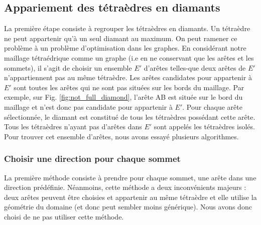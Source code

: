 \subsection{Appariement des tétraèdres en diamants}
\noindent
La première étape consiste à regrouper les tétraèdres en diamants. Un tétraèdre ne peut appartenir qu'à un seul diamant au maximum. On peut ramener ce problème à un problème d'optimisation dans les graphes. En considérant notre maillage tétraédrique comme un graphe (i.e en ne conservant que les arêtes et les sommets), il s'agit de choisir un ensemble $E'$ d'arêtes telles-que deux arêtes de $E'$ n'appartiennent pas au même tétraèdre. Les arêtes candidates pour appartenir à $E'$ sont toutes les arêtes qui ne sont pas situées sur les bords du maillage. Par exemple, sur Fig. \ref{fig:not_full_diamond}, l'arête AB est située sur le bord du maillage et n'est donc pas candidate pour appartenir à $E'$. Pour chaque arête sélectionnée, le diamant est constitué de tous les tétraèdres possédant cette arête. Tous les tétraèdres n'ayant pas d'arêtes dans $E'$ sont appelés les tétraèdres isolés.\\
Pour trouver cet ensemble d'arêtes, nous avons essayé plusieurs algorithmes.
\subsubsection{Choisir une direction pour chaque sommet}
\noindent
La première méthode consiste à prendre pour chaque sommet, une arête dans une direction prédéfinie. Néanmoins, cette méthode a deux inconvénients majeurs : deux arêtes peuvent être choisies et appartenir au même tétraèdre et elle utilise la géométrie du domaine (et donc peut sembler moins générique). Nous avons donc choisi de ne pas utiliser cette méthode.

